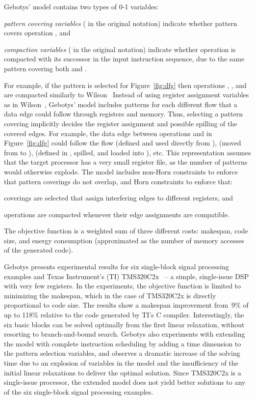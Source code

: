 \documentclass[acmsmall,authorversion,nonacm]{acmart}
\newcommand{\var}[2]{}
\begin{document}
Gebotys' model contains two types of 0-1 variables:
\begin{inparaitem}[]
\item \emph{pattern covering variables} \var{c}{o,p} ( in the
  original notation) indicate whether pattern  covers operation
  , and
\item \emph{compaction variables} \var{m}{o} ( in the original
  notation) indicate whether operation  is compacted with its
  successor  in the input instruction sequence, due to the same
  pattern covering both  and \!.
\end{inparaitem}
For example, if the pattern  is selected for
Figure~\ref{fig:dfg} then operations , , and
 are compacted similarly to Wilson~\etal{}
Instead of using register assignment variables as in Wilson~\etal{},
Gebotys' model includes patterns for each different flow that a data
edge could follow through registers and memory.
Thus, selecting a pattern covering implicitly decides the register
assignment and possible spilling of the covered edges.
For example, the data edge between operations  and  in
Figure~\ref{fig:dfg} could follow the flow  (defined and used directly from ),
 (moved from 
to ),  (defined in , spilled, and
loaded into ), etc.
This representation assumes that the target processor has a very small
register file, as the number of patterns would otherwise explode.
The model includes non-Horn constraints to enforce that pattern
coverings do not overlap, and Horn constraints to enforce that:
\begin{inparaitem}[]
\item coverings are selected that assign interfering edges to
  different registers, and
\item operations are compacted whenever their edge assignments are
  compatible.
\end{inparaitem}
The objective function is a weighted sum of three different costs:
makespan, code size, and energy consumption (approximated as the
number of memory accesses of the generated code).

Gebotys presents experimental results for six single-block signal
processing examples and Texas Instrument's (TI) TMS320C2x~\cite{C2x}
-- a simple, single-issue DSP with very few registers.
In the experiments, the objective function is limited to minimizing
the makespan, which in the case of TMS320C2x is directly proportional
to code size.
The results show a makespan improvement from~9\% of up to 118\%
relative to the code generated by TI's C compiler.
Interestingly, the six basic blocks can be solved optimally from the
first linear relaxation, without resorting to branch-and-bound search.
Gebotys also experiments with extending the model with complete
instruction scheduling by adding a time dimension to the pattern
selection variables, and observes a dramatic increase of the solving
time due to an explosion of variables in the model and the
insufficiency of the initial linear relaxations to deliver the optimal
solution.
Since TMS320C2x is a single-issue processor, the extended model does
not yield better solutions to any of the six single-block signal
processing examples.
\end{document}
